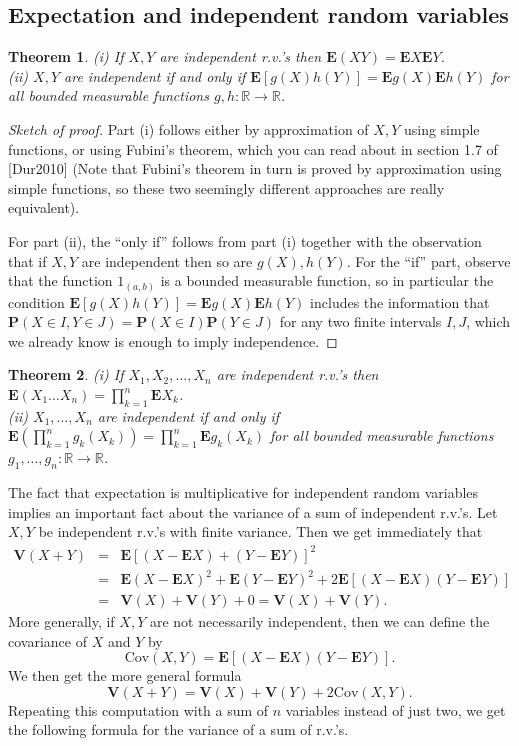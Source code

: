 \documentclass[12pt]{article}
\newtheorem{thm}{Theorem}[section]
\newcommand{\R}{\mathbb{R}}
\newcommand{\prob}{\mathbf{P}}
\newcommand{\expec}{\mathbf{E}}
\newcommand{\var}{\mathbf{V}}
\newcommand{\cov}{\textrm{Cov}}
\theoremstyle{example}
\begin{document}
\subsection{Expectation and independent random variables}

\begin{thm} (i) If $X,Y$ are independent r.v.'s then $\expec(X Y) = \expec X \expec Y$.
\\
(ii) $X,Y$ are independent if and only if $\expec[g(X)h(Y)] = \expec g(X) \expec h(Y)$ for all bounded measurable functions $g,h:\R\to\R$.
\end{thm}

\begin{proof}[Sketch of proof] Part (i) follows either by approximation of $X,Y$ using simple functions, or using Fubini's theorem, which you can read about in section 1.7 of [Dur2010] (Note that Fubini's theorem in turn is proved by approximation using simple functions, so these two seemingly different approaches are really equivalent).

For part (ii), the ``only if'' follows from part (i) together with the observation that if $X,Y$ are independent then so are $g(X), h(Y)$. For the ``if'' part, observe that the function $1_{(a,b)}$ is a bounded measurable function, so in particular the condition $\expec[g(X)h(Y)]=\expec g(X) \expec h(Y)$ includes the information that $\prob(X\in I, Y\in J)=\prob(X \in I) \prob(Y\in J)$ for any two finite intervals $I,J$, which we already know is enough to imply independence.
\end{proof}


\begin{thm} (i) If $X_1,X_2,\ldots,X_n$ are independent r.v.'s then $\expec(X_1 \ldots X_n) = \prod_{k=1}^n \expec X_k$.
\\
(ii) $X_1,\ldots,X_n$ are independent if and only if $\expec\left(\prod_{k=1}^n g_k(X_k)\right) = \prod_{k=1}^n \expec g_k(X_k)$ for all bounded measurable functions $g_1,\ldots,g_n:\R\to\R$.
\end{thm}

The fact that expectation is multiplicative for independent random variables implies an important fact about the variance of a sum of independent r.v.'s. Let $X,Y$ be independent r.v.'s with finite variance. Then we get immediately that
\begin{eqnarray*}
\var(X+Y) &=& \expec\left[(X-\expec X)+(Y-\expec Y)\right]^2 \\ &=&
\expec(X-\expec X)^2 + \expec(Y-\expec Y)^2 +2 \expec\left[ (X-\expec X)(Y-\expec Y)\right]
\\ &=& \var(X)+\var(Y) + 0 = \var(X)+\var(Y).
\end{eqnarray*}
More generally, if $X,Y$ are not necessarily independent, then we can define the \textrm{covariance of $X$ and $Y$} by
$$ \cov(X,Y) = \expec\left[ (X-\expec X)(Y-\expec Y)\right]. $$
We then get the more general formula
$$ \var(X+Y) = \var(X) + \var(Y) + 2 \cov(X,Y). $$
Repeating this computation with a sum of $n$ variables instead of just two, we get the following formula for the variance of a sum of r.v.'s.
\end{document}
